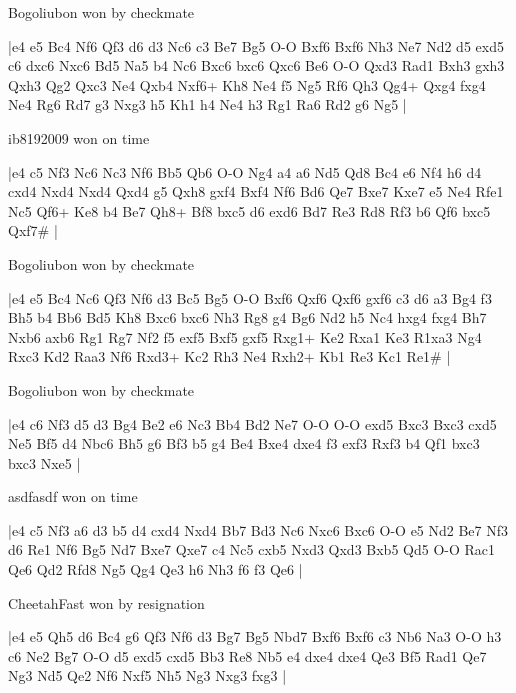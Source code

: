 \showboard

Bogoliubon won by checkmate

\makegametitle
|e4 e5 Bc4 Nf6 Qf3 d6 d3 Nc6 c3 Be7 Bg5 O-O Bxf6 Bxf6 Nh3 Ne7 Nd2 d5 exd5 c6 dxc6 Nxc6 Bd5 Na5 b4 Nc6 Bxc6 bxc6 Qxc6 Be6 O-O Qxd3 Rad1 Bxh3 gxh3 Qxh3 Qg2 Qxc3 Ne4 Qxb4 Nxf6+ Kh8 Ne4 f5 Ng5 Rf6 Qh3 Qg4+ Qxg4 fxg4 Ne4 Rg6 Rd7 g3 Nxg3 h5 Kh1 h4 Ne4 h3 Rg1 Ra6 Rd2 g6 Ng5  |

\showboard

ib8192009 won on time

\makegametitle
|e4 c5 Nf3 Nc6 Nc3 Nf6 Bb5 Qb6 O-O Ng4 a4 a6 Nd5 Qd8 Bc4 e6 Nf4 h6 d4 cxd4 Nxd4 Nxd4 Qxd4 g5 Qxh8 gxf4 Bxf4 Nf6 Bd6 Qe7 Bxe7 Kxe7 e5 Ne4 Rfe1 Nc5 Qf6+ Ke8 b4 Be7 Qh8+ Bf8 bxc5 d6 exd6 Bd7 Re3 Rd8 Rf3 b6 Qf6 bxc5 Qxf7\#  |

\showboard

Bogoliubon won by checkmate

\makegametitle
|e4 e5 Bc4 Nc6 Qf3 Nf6 d3 Bc5 Bg5 O-O Bxf6 Qxf6 Qxf6 gxf6 c3 d6 a3 Bg4 f3 Bh5 b4 Bb6 Bd5 Kh8 Bxc6 bxc6 Nh3 Rg8 g4 Bg6 Nd2 h5 Nc4 hxg4 fxg4 Bh7 Nxb6 axb6 Rg1 Rg7 Nf2 f5 exf5 Bxf5 gxf5 Rxg1+ Ke2 Rxa1 Ke3 R1xa3 Ng4 Rxc3 Kd2 Raa3 Nf6 Rxd3+ Kc2 Rh3 Ne4 Rxh2+ Kb1 Re3 Kc1 Re1\#  |

\showboard

Bogoliubon won by checkmate

\makegametitle
|e4 c6 Nf3 d5 d3 Bg4 Be2 e6 Nc3 Bb4 Bd2 Ne7 O-O O-O exd5 Bxc3 Bxc3 cxd5 Ne5 Bf5 d4 Nbc6 Bh5 g6 Bf3 b5 g4 Be4 Bxe4 dxe4 f3 exf3 Rxf3 b4 Qf1 bxc3 bxc3 Nxe5  |

\showboard

asdfasdf won on time

\makegametitle
|e4 c5 Nf3 a6 d3 b5 d4 cxd4 Nxd4 Bb7 Bd3 Nc6 Nxc6 Bxc6 O-O e5 Nd2 Be7 Nf3 d6 Re1 Nf6 Bg5 Nd7 Bxe7 Qxe7 c4 Nc5 cxb5 Nxd3 Qxd3 Bxb5 Qd5 O-O Rac1 Qe6 Qd2 Rfd8 Ng5 Qg4 Qe3 h6 Nh3 f6 f3 Qe6  |

\showboard

CheetahFast won by resignation

\makegametitle
|e4 e5 Qh5 d6 Bc4 g6 Qf3 Nf6 d3 Bg7 Bg5 Nbd7 Bxf6 Bxf6 c3 Nb6 Na3 O-O h3 c6 Ne2 Bg7 O-O d5 exd5 cxd5 Bb3 Re8 Nb5 e4 dxe4 dxe4 Qe3 Bf5 Rad1 Qe7 Ng3 Nd5 Qe2 Nf6 Nxf5 Nh5 Ng3 Nxg3 fxg3  |

